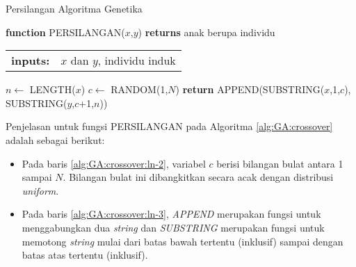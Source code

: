 \begin{algorithm}[H]
	\caption{Persilangan Algoritma Genetika}
	\label{alg:GA:crossover}
	\begin{flushleft}
		\textbf{function} PERSILANGAN($x$,$y$) \textbf{returns} anak berupa individu
		\begin{flushleft}
			\begin{tabular}{ l l }
				\textbf{inputs:}& $x$ dan $y$, individu induk
				\hspace{5pt} 
			\end{tabular} 
		\end{flushleft}
	\end{flushleft}

	\begin{algorithmic}[1]
		\STATE $n \leftarrow$ LENGTH($x$) \label{alg:GA:crossover:ln-1}
		\STATE $c \leftarrow$ RANDOM(1,$N$) \label{alg:GA:crossover:ln-2}
		\STATE \textbf{return} APPEND(SUBSTRING($x$,1,$c$), SUBSTRING($y$,$c$+1,$n$)) \label{alg:GA:crossover:ln-3}
	\end{algorithmic}
\end{algorithm}

Penjelasan untuk fungsi PERSILANGAN pada Algoritma \ref{alg:GA:crossover} adalah sebagai berikut:
\begin{itemize}
	\item Pada baris \ref{alg:GA:crossover:ln-2}, variabel $c$ berisi bilangan bulat antara 1 sampai $N$. Bilangan bulat ini dibangkitkan secara acak dengan distribusi \textit{uniform}.
	\item Pada baris \ref{alg:GA:crossover:ln-3}, \textit{APPEND} merupakan fungsi untuk menggabungkan dua \textit{string} dan \textit{SUBSTRING} merupakan fungsi untuk memotong \textit{string} mulai dari batas bawah tertentu (inklusif) sampai dengan batas atas tertentu (inklusif).
\end{itemize}

